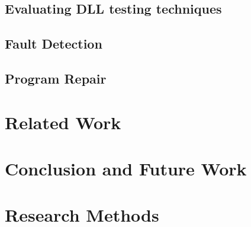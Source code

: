 \documentclass[sigconf]{acmart}
\begin{document}
\subsection{Evaluating DLL testing techniques}
\subsection{Fault Detection}
\subsection{Program Repair}


\section{Related Work} 

\section{Conclusion and Future Work}




\appendix

\section{Research Methods}
\end{document}
